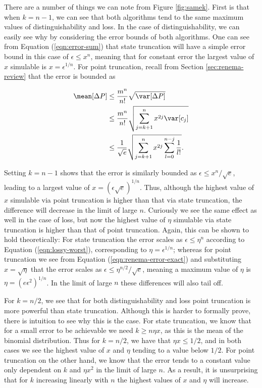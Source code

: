 There are a number of things we can note from Figure \ref{fig:samek}. 
First is that when $k=n-1$, we can see that both algorithms tend to the same maximum values of distinguishability and loss. 
In the case of distinguishability, we can easily see why by considering the error bounds of both algorithms. 
One can see from Equation (\ref{eqn:error-sum}) that state truncation will have a simple error bound in this case of $\epsilon \leq x^n$, meaning that for constant error the largest value of $x$ simulable is $x = \epsilon^{1/n}$. 
For point truncation, recall from Section \ref{sec:renema-review} that the error is bounded as

\begin{align}
\mean[\Delta P] &\leq \frac{m^n}{n!}\sqrt{\var[\Delta P]}\\
&\leq \frac{m^n}{n!}\sqrt{\sum_{j=k+1}^nx^{2j}\var[c_j]}\\
&\leq \frac{1}{\sqrt{e}}\sqrt{\sum_{j=k+1}^nx^{2j}\sum_{l=0}^{n-j}\frac{1}{l!}}\label{eqn:renema-error-exact}.
\end{align}

Setting $k=n-1$ shows that the error is similarly bounded as $\epsilon \leq x^n/\sqrt{e}$, leading to a largest value of $x=(\epsilon\sqrt{e})^{1/n}$. 
Thus, although the highest value of $x$ simulable via point truncation is higher than that via state truncation, the difference will decrease in the limit of large $n$. 
Curiously we see the same effect as well in the case of loss, but now the highest value of $\eta$ simulable via state truncation is higher than that of point truncation. 
Again, this can be shown to hold theoretically: For state truncation the error scales as $\epsilon \leq \eta^n$ according to Equation (\ref{eqn:lossy-worst}), corresponding to $\eta=\epsilon^{1/n}$; whereas for point truncation we see from Equation (\ref{eqn:renema-error-exact}) and substituting $x=\sqrt{\eta}$ that the error scales as $\epsilon \leq \eta^{n/2}/\sqrt{e}$, meaning a maximum value of $\eta$ is $\eta=(e\epsilon^2)^{1/n}$. 
In the limit of large $n$ these differences will also tail off.

For $k=n/2$, we see that for both distinguishability and loss point truncation is more powerful than state truncation. 
Although this is harder to formally prove, there is intuition to see why this is the case. 
For state truncation, we know that for a small error to be achievable we need $k\geq n\eta x$, as this is the mean of the binomial distribution. 
Thus for $k=n/2$, we have that $\eta x \leq 1/2$, and in both cases we see the highest value of $x$ and $\eta$ tending to a value below $1/2$. 
For point truncation on the other hand, we know that the error tends to a constant value only dependent on $k$ and $\eta x^2$ in the limit of large $n$. 
As a result, it is unsurprising that for $k$ increasing linearly with $n$ the highest values of $x$ and $\eta$ will increase.


